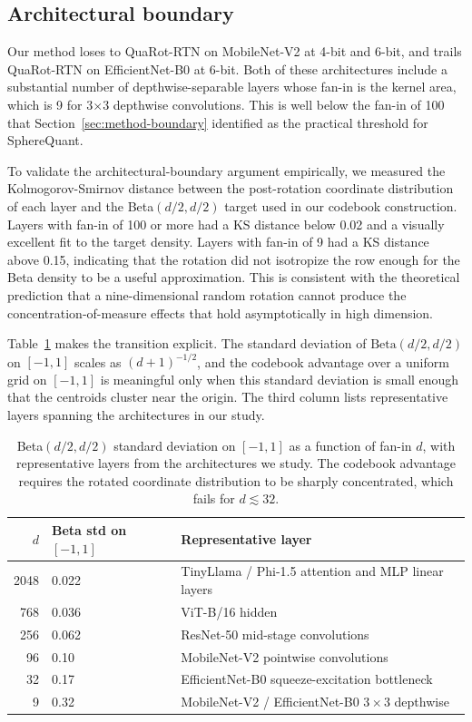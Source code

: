 \subsection{Architectural boundary}
\label{sec:experiments-boundary}

Our method loses to QuaRot-RTN on MobileNet-V2 at 4-bit and 6-bit, and
trails QuaRot-RTN on EfficientNet-B0 at 6-bit. Both of these
architectures include a substantial number of depthwise-separable
layers whose fan-in is the kernel area, which is 9 for 3$\times$3
depthwise convolutions. This is well below the fan-in of 100 that
Section~\ref{sec:method-boundary} identified as the practical
threshold for SphereQuant.

To validate the architectural-boundary argument empirically, we
measured the Kolmogorov-Smirnov distance between the post-rotation
coordinate distribution of each layer and the Beta$(d/2, d/2)$ target
used in our codebook construction. Layers with fan-in of 100 or more
had a KS distance below 0.02 and a visually excellent fit to the
target density. Layers with fan-in of 9 had a KS distance above 0.15,
indicating that the rotation did not isotropize the row enough for
the Beta density to be a useful approximation. This is consistent
with the theoretical prediction that a nine-dimensional random
rotation cannot produce the concentration-of-measure effects that
hold asymptotically in high dimension.

Table~\ref{tab:fanin-beta} makes the transition explicit. The
standard deviation of $\mathrm{Beta}(d/2, d/2)$ on $[-1, 1]$ scales as
$(d+1)^{-1/2}$, and the codebook advantage over a uniform grid on
$[-1, 1]$ is meaningful only when this standard deviation is small
enough that the centroids cluster near the origin. The third column
lists representative layers spanning the architectures in our study.

\begin{table}[h]
\centering
\caption{Beta$(d/2, d/2)$ standard deviation on $[-1, 1]$ as a function
of fan-in $d$, with representative layers from the architectures we
study. The codebook advantage requires the rotated coordinate
distribution to be sharply concentrated, which fails for
$d \lesssim 32$.}
\label{tab:fanin-beta}
\begin{tabular}{rll}
\hline
$d$  & Beta std on $[-1, 1]$ & Representative layer \\
\hline
2048 & 0.022 & TinyLlama / Phi-1.5 attention and MLP linear layers \\
768  & 0.036 & ViT-B/16 hidden \\
256  & 0.062 & ResNet-50 mid-stage convolutions \\
96   & 0.10  & MobileNet-V2 pointwise convolutions \\
32   & 0.17  & EfficientNet-B0 squeeze-excitation bottleneck \\
9    & 0.32  & MobileNet-V2 / EfficientNet-B0 $3{\times}3$ depthwise \\
\hline
\end{tabular}
\end{table}

